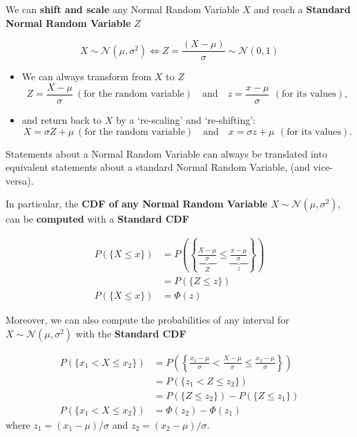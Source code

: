 \documentclass[smaller]{beamer}\usepackage[]{graphicx}\usepackage[]{color}
\renewcommand{\Pr}{P}
\newcommand{\N}{\mathcal{N}}
\begin{document}
\begin{frame}{\subsecname}
  
  We can \textbf{shift and scale} any Normal Random Variable $X$ and reach a \textbf{Standard Normal Random Variable} $Z$ 
  
  $$X\sim \N\left( \mu ,\sigma ^{2}\right)\Longleftrightarrow Z=\frac{\left( X-\mu \right) }{\sigma }\sim \N\left( 0,1\right)$$
  
  \begin{itemize}
  \item We can always transform from $X$ to $Z$ 
  \begin{equation*}
  Z=\frac{X-\mu }{\sigma } \ (\text{for the random variable}) \quad\mbox{and}\quad z=\frac{x-\mu }{\sigma }\,  \ (\text{for its values}) ,
  \end{equation*}
  \item and return back to $X$ by a `re-scaling' and `re-shifting':%
  \begin{equation*}
  X=\sigma Z+\mu  \ (\text{for the random variable}) \quad\mbox{and}\quad x=\sigma z+\mu\, \ (\text{for its values}) .
  \end{equation*}
  \end{itemize}
Statements about a Normal Random Variable can always be translated into equivalent statements about a standard Normal Random Variable, (and vice-versa).
\end{frame}

\begin{frame}{\subsecname}
  In particular, the \textbf{CDF of any Normal Random Variable} $X\sim \N(\mu, \sigma^2)$, can 
  be \textbf{computed} with a \textbf{Standard CDF}
  
  \begin{align*}
  P(\{ X\leq x\}) &= 
  P\left(\left\{\underbrace{\frac{X-\mu}{\sigma}}_Z\leq \underbrace{\frac{x-\mu}{\sigma}}_{z}\right\}\right) \\
  &= P(\{ Z\leq z\}) \\
  P(\{ X\leq x\})&= \Phi(z)
  \end{align*}
\end{frame}

\begin{frame}{\subsecname}
Moreover, we can also compute the probabilities of any interval for $X\sim \N\left( \mu ,\sigma ^{2}\right)$ with the \textbf{Standard CDF}

\begin{align*}
  \Pr(\{x_1<X\leq x_2\}) &= 
  \Pr\left(\left\{\frac{x_1-\mu}{\sigma}<\frac{X-\mu}{\sigma}\leq \frac{x_2-\mu}{\sigma}\right\}\right) \\ 
  &= \Pr(\{z_1<Z\leq z_2\})\\
  &= \Pr(\{Z\leq z_2\}) - \Pr(\{Z\leq z_1\})\\
  \Pr(\{x_1<X\leq x_2\}) &= \Phi(z_2)-\Phi(z_1)
\end{align*}
where $z_1=(x_1-\mu)/\sigma$ and $z_2=(x_2-\mu)/\sigma$.
\end{frame}
\end{document}
